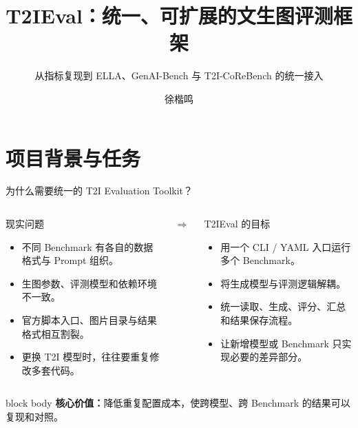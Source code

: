 \documentclass[aspectratio=169,10pt]{beamer}
\title[T2IEval]{T2IEval：统一、可扩展的文生图评测框架}
\subtitle{从指标复现到 ELLA、GenAI-Bench 与 T2I-CoReBench 的统一接入}
\author{徐楷鸣}
\institute{}
\date{}
\begin{document}
\begin{frame}[plain]
  \titlepage
\end{frame}

\section{项目背景与任务}
\begin{frame}{为什么需要统一的 T2I Evaluation Toolkit？}
  \begin{columns}[T,onlytextwidth]
      \begin{block}{现实问题}
        \begin{itemize}\small
          \item 不同 Benchmark 有各自的数据格式与 Prompt 组织。
          \item 生图参数、评测模型和依赖环境不一致。
          \item 官方脚本入口、图片目录与结果格式相互割裂。
          \item 更换 T2I 模型时，往往要重复修改多套代码。
        \end{itemize}
      \end{block}
      \vspace{1.7cm}\centering\Large$\Longrightarrow$
      \begin{block}{T2IEval 的目标}
        \begin{itemize}\small
          \item 用一个 CLI / YAML 入口运行多个 Benchmark。
          \item 将生成模型与评测逻辑解耦。
          \item 统一读取、生成、评分、汇总和结果保存流程。
          \item 让新增模型或 Benchmark 只实现必要的差异部分。
        \end{itemize}
      \end{block}
  \end{columns}

  \vspace{0.8em}
  \begin{beamercolorbox}[sep=0.9em,rounded=true]{block body}
    \centering
    \textbf{核心价值：}降低重复配置成本，使跨模型、跨 Benchmark 的结果可以复现和对照。
  \end{beamercolorbox}
\end{frame}
\end{document}
